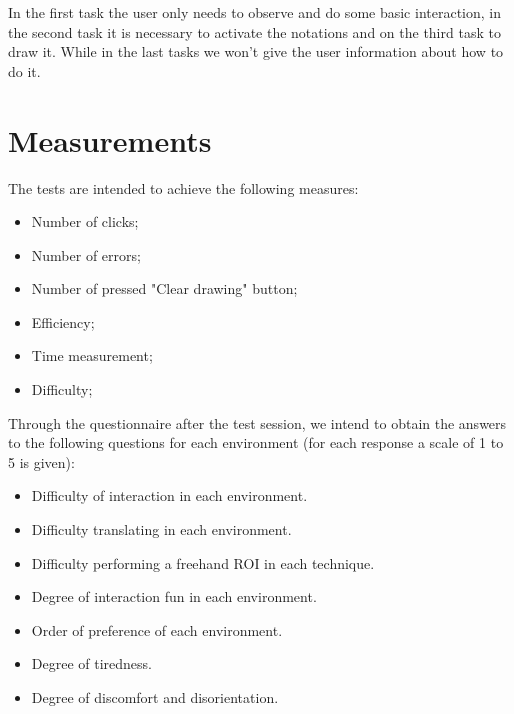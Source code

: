 \documentclass{article}
\begin{document}
In the first task the user only needs to observe and do some basic interaction, in the second task it is necessary to activate the notations and on the third task to draw it. While in the last tasks we won't give the user information about how to do it.

\section{Measurements}

The tests are intended to achieve the following measures:

\begin{itemize}
  \item Number of clicks;
  \item Number of errors;
  \item Number of pressed "Clear drawing" button;
  \item Efficiency;
  \item Time measurement;
  \item Difficulty;
\end{itemize}

\clearpage

Through the questionnaire after the test session, we intend to obtain the answers to the following questions for each environment (for each response a scale of 1 to 5 is given):

\begin{itemize}
  \item Difficulty of interaction in each environment.
  \item Difficulty translating in each environment.
  \item Difficulty performing a freehand ROI in each technique.
  \item Degree of interaction fun in each environment.
  \item Order of preference of each environment.
  \item Degree of tiredness.
  \item Degree of discomfort and disorientation.
\end{itemize}
\end{document}
